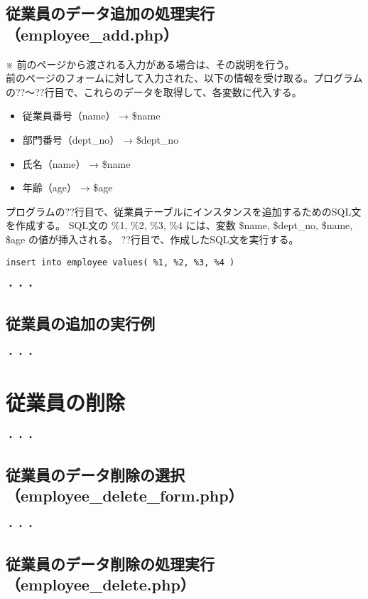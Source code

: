 \documentclass[a4j,12pt]{jreport}
\begin{document}
\subsection{従業員のデータ追加の処理実行（employee\_add.php）}

※ 前のページから渡される入力がある場合は、その説明を行う。\\

前のページのフォームに対して入力された、以下の情報を受け取る。プログラムの??～??行目で、これらのデータを取得して、各変数に代入する。

\begin{itemize}
\item 従業員番号（name） → \$name
\item 部門番号（dept\_no） → \$dept\_no
\item 氏名（name） → \$name
\item 年齢（age） → \$age
\end{itemize}

プログラムの??行目で、従業員テーブルにインスタンスを追加するためのSQL文を作成する。
SQL文の \%1, \%2, \%3, \%4 には、変数 \$name, \$dept\_no, \$name, \$age の値が挿入される。
??行目で、作成したSQL文を実行する。\\

\begin{lstlisting}[caption=従業員の追加のためのSQL]
insert into employee values( %1, %2, %3, %4 )
\end{lstlisting}
\vspace{3mm}

・・・

\subsection{従業員の追加の実行例}

・・・


\section{従業員の削除}

・・・

\subsection{従業員のデータ削除の選択（employee\_delete\_form.php）}

・・・

\subsection{従業員のデータ削除の処理実行（employee\_delete.php）}
\end{document}
